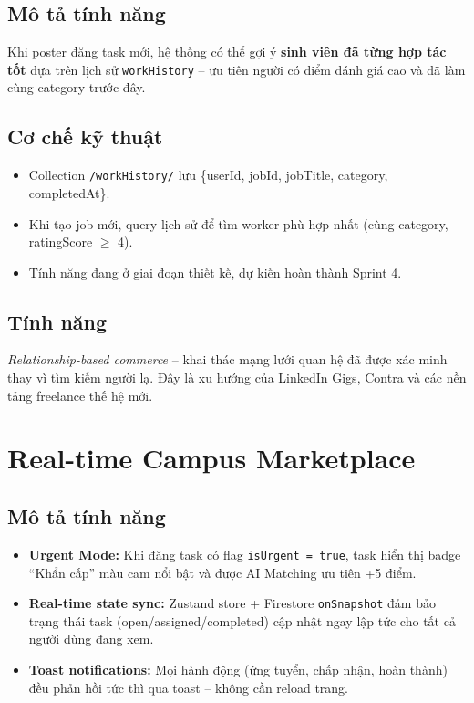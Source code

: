 \subsection*{Mô tả tính năng}

Khi poster đăng task mới, hệ thống có thể gợi ý \textbf{sinh viên đã từng hợp tác tốt}
dựa trên lịch sử \texttt{workHistory} -- ưu tiên người có điểm đánh giá cao và đã làm
cùng category trước đây.

\subsection*{Cơ chế kỹ thuật}

\begin{itemize}
  \item Collection \texttt{/workHistory/} lưu \{userId, jobId, jobTitle, category, completedAt\}.
  \item Khi tạo job mới, query lịch sử để tìm worker phù hợp nhất (cùng category,
    ratingScore $\geq$ 4).
  \item Tính năng đang ở giai đoạn thiết kế, dự kiến hoàn thành Sprint 4.
\end{itemize}

\subsection*{Tính năng}

\textit{Relationship-based commerce} -- khai thác mạng lưới quan hệ đã được xác minh
thay vì tìm kiếm người lạ. Đây là xu hướng của LinkedIn Gigs, Contra và các nền tảng
freelance thế hệ mới.

\section{Real-time Campus Marketplace}

\subsection*{Mô tả tính năng}

\begin{itemize}
  \item \textbf{Urgent Mode:} Khi đăng task có flag \texttt{isUrgent = true}, task
    hiển thị badge ``Khẩn cấp'' màu cam nổi bật và được AI Matching ưu tiên +5 điểm.
  \item \textbf{Real-time state sync:} Zustand store + Firestore \texttt{onSnapshot}
    đảm bảo trạng thái task (open/assigned/completed) cập nhật ngay lập tức cho tất cả
    người dùng đang xem.
  \item \textbf{Toast notifications:} Mọi hành động (ứng tuyển, chấp nhận, hoàn thành)
    đều phản hồi tức thì qua toast -- không cần reload trang.
\end{itemize}

